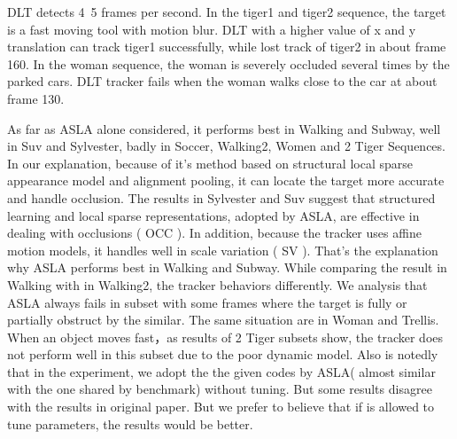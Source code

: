 \documentclass{acm_proc_article-sp}
\begin{document}
DLT detects 4~5 frames per second.
In the tiger1 and tiger2 sequence, the target is a fast moving tool with motion blur.
DLT with a higher value of x and y translation can track tiger1 successfully, while lost track of tiger2 in about frame 160. In the woman sequence, the woman is severely occluded several times by the parked cars. DLT tracker fails when the woman walks close to the car at about frame 130.

As far as ASLA alone considered, it performs best in Walking and Subway, well in Suv and Sylvester, badly in Soccer, Walking2, Women and 2 Tiger Sequences. 
In our explanation, because of it’s method based on structural local sparse appearance model and alignment pooling, it can locate the target more accurate and handle occlusion. 
The results in Sylvester and Suv suggest that structured learning and local sparse representations, adopted by ASLA, are effective in dealing with occlusions ( OCC ).
In addition, because the tracker uses affine motion models, it handles well in scale variation ( SV ).
That’s the explanation why ASLA performs best in Walking and Subway. While comparing the result in Walking with in Walking2, the tracker behaviors differently.
We analysis that ASLA always fails in subset with some frames where the target is fully or partially obstruct by the similar.
The same situation are in Woman and Trellis. When an object moves fast，as results of 2 Tiger subsets show, the tracker does not perform well in this subset due to the poor dynamic model.
Also is notedly that in the experiment, we adopt the the given codes by ASLA( almost similar with the one shared by benchmark) without tuning.
But some results disagree with the results in original paper.
But we prefer to believe that if is allowed to tune parameters, the results would be better.
\end{document}

